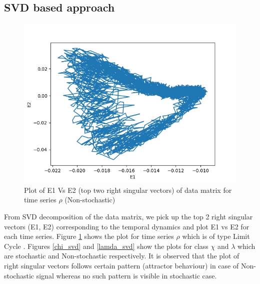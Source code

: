 \documentclass[10pt,conference]{IEEEtran}
\begin{document}
\subsection{SVD based approach}

\begin{figure}[ht]
  \centering
  \includegraphics[width=\linewidth]{rho_svd.jpg}
  \caption{Plot of E1 Vs E2 (top two right singular vectors) of data matrix for  time series $\rho$ (Non-stochastic)}
  \label{svd_rho}
\end{figure}

From SVD decomposition of the data matrix, we pick up the top 2 right singular vectors (E1, E2) corresponding to the temporal dynamics and plot E1 vs E2 for each time series. Figure \ref{svd_rho} shows the plot for time series $\rho$ which is of type Limit Cycle \cite{misra2006}. Figures \ref{chi_svd} and \ref{lamda_svd} show the plots for class $\chi$ and $\lambda$  which are stochastic and Non-stochastic respectively. It is observed that the plot of right singular vectors follows certain pattern (attractor behaviour) in case of Non-stochastic signal whereas no such pattern is visible in stochastic case.
\end{document}
